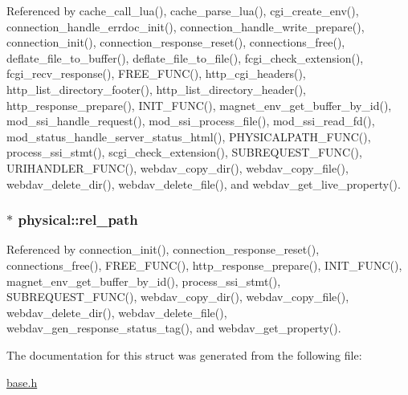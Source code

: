 Referenced by cache\-\_\-call\-\_\-lua(), cache\-\_\-parse\-\_\-lua(), cgi\-\_\-create\-\_\-env(), connection\-\_\-handle\-\_\-errdoc\-\_\-init(), connection\-\_\-handle\-\_\-write\-\_\-prepare(), connection\-\_\-init(), connection\-\_\-response\-\_\-reset(), connections\-\_\-free(), deflate\-\_\-file\-\_\-to\-\_\-buffer(), deflate\-\_\-file\-\_\-to\-\_\-file(), fcgi\-\_\-check\-\_\-extension(), fcgi\-\_\-recv\-\_\-response(), F\-R\-E\-E\-\_\-\-F\-U\-N\-C(), http\-\_\-cgi\-\_\-headers(), http\-\_\-list\-\_\-directory\-\_\-footer(), http\-\_\-list\-\_\-directory\-\_\-header(), http\-\_\-response\-\_\-prepare(), I\-N\-I\-T\-\_\-\-F\-U\-N\-C(), magnet\-\_\-env\-\_\-get\-\_\-buffer\-\_\-by\-\_\-id(), mod\-\_\-ssi\-\_\-handle\-\_\-request(), mod\-\_\-ssi\-\_\-process\-\_\-file(), mod\-\_\-ssi\-\_\-read\-\_\-fd(), mod\-\_\-status\-\_\-handle\-\_\-server\-\_\-status\-\_\-html(), P\-H\-Y\-S\-I\-C\-A\-L\-P\-A\-T\-H\-\_\-\-F\-U\-N\-C(), process\-\_\-ssi\-\_\-stmt(), scgi\-\_\-check\-\_\-extension(), S\-U\-B\-R\-E\-Q\-U\-E\-S\-T\-\_\-\-F\-U\-N\-C(), U\-R\-I\-H\-A\-N\-D\-L\-E\-R\-\_\-\-F\-U\-N\-C(), webdav\-\_\-copy\-\_\-dir(), webdav\-\_\-copy\-\_\-file(), webdav\-\_\-delete\-\_\-dir(), webdav\-\_\-delete\-\_\-file(), and webdav\-\_\-get\-\_\-live\-\_\-property().

\hypertarget{structphysical_a5122d5a7e9aa4be1b5719701571c172d}{
\subsubsection[{rel\-\_\-path}]{$\ast$ physical\-::rel\-\_\-path}}\label{structphysical_a5122d5a7e9aa4be1b5719701571c172d}


Referenced by connection\-\_\-init(), connection\-\_\-response\-\_\-reset(), connections\-\_\-free(), F\-R\-E\-E\-\_\-\-F\-U\-N\-C(), http\-\_\-response\-\_\-prepare(), I\-N\-I\-T\-\_\-\-F\-U\-N\-C(), magnet\-\_\-env\-\_\-get\-\_\-buffer\-\_\-by\-\_\-id(), process\-\_\-ssi\-\_\-stmt(), S\-U\-B\-R\-E\-Q\-U\-E\-S\-T\-\_\-\-F\-U\-N\-C(), webdav\-\_\-copy\-\_\-dir(), webdav\-\_\-copy\-\_\-file(), webdav\-\_\-delete\-\_\-dir(), webdav\-\_\-delete\-\_\-file(), webdav\-\_\-gen\-\_\-response\-\_\-status\-\_\-tag(), and webdav\-\_\-get\-\_\-property().



The documentation for this struct was generated from the following file\-:\begin{DoxyCompactItemize}
\item 
\hyperlink{base_8h}{base.\-h}\end{DoxyCompactItemize}
